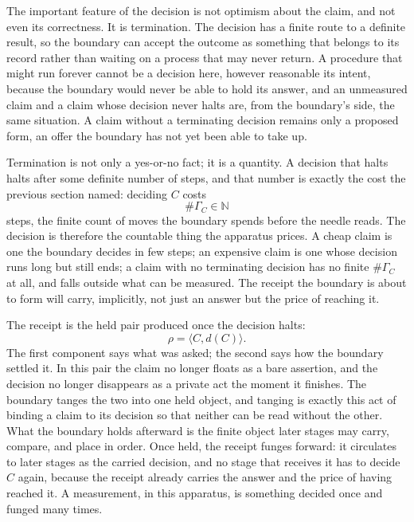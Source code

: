 The important feature of the decision is not optimism about the claim, and not even its correctness. It is termination. The decision has a finite route to a definite result, so the boundary can accept the outcome as something that belongs to its record rather than waiting on a process that may never return. A procedure that might run forever cannot be a decision here, however reasonable its intent, because the boundary would never be able to hold its answer, and an unmeasured claim and a claim whose decision never halts are, from the boundary's side, the same situation. A claim without a terminating decision remains only a proposed form, an offer the boundary has not yet been able to take up.

Termination is not only a yes-or-no fact; it is a quantity. A decision that halts halts after some definite number of steps, and that number is exactly the cost the previous section named: deciding \(C\) costs
\[
  \#\Gamma_C \in \mathbb{N}
\]
steps, the finite count of moves the boundary spends before the needle reads. The decision is therefore the countable thing the apparatus prices. A cheap claim is one the boundary decides in few steps; an expensive claim is one whose decision runs long but still ends; a claim with no terminating decision has no finite \(\#\Gamma_C\) at all, and falls outside what can be measured. The receipt the boundary is about to form will carry, implicitly, not just an answer but the price of reaching it.

The receipt is the held pair produced once the decision halts:
\[
  \rho = \langle C, d(C)\rangle .
\]
The first component says what was asked; the second says how the boundary settled it. In this pair the claim no longer floats as a bare assertion, and the decision no longer disappears as a private act the moment it finishes. The boundary tanges the two into one held object, and tanging is exactly this act of binding a claim to its decision so that neither can be read without the other. What the boundary holds afterward is the finite object later stages may carry, compare, and place in order. Once held, the receipt funges forward: it circulates to later stages as the carried decision, and no stage that receives it has to decide \(C\) again, because the receipt already carries the answer and the price of having reached it. A measurement, in this apparatus, is something decided once and funged many times.


